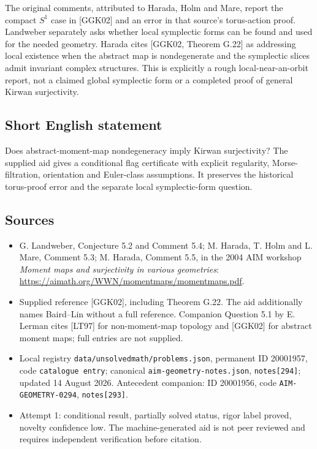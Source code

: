 \documentclass[11pt]{article}
\begin{document}
The original comments, attributed to Harada, Holm and Mare, report the compact \(S^1\) case in [GGK02] and an error in that source's torus-action proof. Landweber separately asks whether local symplectic forms can be found and used for the needed geometry. Harada cites [GGK02, Theorem G.22] as addressing local existence when the abstract map is nondegenerate and the symplectic slices admit invariant complex structures. This is explicitly a rough local-near-an-orbit report, not a claimed global symplectic form or a completed proof of general Kirwan surjectivity.
\subsection{Short English statement}
Does abstract-moment-map nondegeneracy imply Kirwan surjectivity? The supplied aid gives a conditional flag certificate with explicit regularity, Morse-filtration, orientation and Euler-class assumptions. It preserves the historical torus-proof error and the separate local symplectic-form question.
\subsection{Sources}
\begin{itemize}
\item G. Landweber, Conjecture 5.2 and Comment 5.4; M. Harada, T. Holm and L. Mare, Comment 5.3; M. Harada, Comment 5.5, in the 2004 AIM workshop \emph{Moment maps and surjectivity in various geometries}: \url{https://aimath.org/WWN/momentmaps/momentmaps.pdf}.
\item Supplied reference [GGK02], including Theorem G.22. The aid additionally names Baird--Lin without a full reference. Companion Question 5.1 by E. Lerman cites [LT97] for non-moment-map topology and [GGK02] for abstract moment maps; full entries are not supplied.
\item Local registry \texttt{data/unsolvedmath/problems.json}, permanent ID 20001957, code \texttt{catalogue entry}; canonical \texttt{aim-geometry-notes.json}, \texttt{notes[294]}; updated 14 August 2026. Antecedent companion: ID 20001956, code \texttt{AIM-GEOMETRY-0294}, \texttt{notes[293]}.
\item Attempt 1: conditional result, partially solved status, rigor label proved, novelty confidence low. The machine-generated aid is not peer reviewed and requires independent verification before citation.
\end{itemize}
\end{document}
